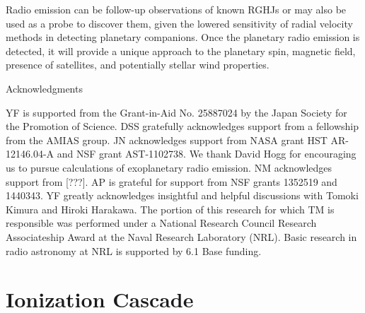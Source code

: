 \documentclass[iop,numberedappendix,apj]{emulateapj}
\begin{document}
Radio emission can be follow-up observations of known RGHJs or may also be used as a probe to discover them, given the lowered sensitivity of  radial velocity methods in detecting planetary companions. 
Once the planetary radio emission is detected, it will provide a unique approach to the planetary spin, magnetic field, presence of satellites, and potentially stellar wind properties. 


\vspace{0.5in}

\acknowledgements

{\sc Acknowledgments}

YF is supported from the Grant-in-Aid No. 25887024 by the Japan Society for the Promotion of Science.
DSS gratefully acknowledges support from a fellowship from the AMIAS group. JN acknowledges support from NASA grant HST AR-12146.04-A and NSF grant AST-1102738.
We thank David Hogg for encouraging us to pursue calculations of exoplanetary radio emission.
NM acknowledges support from [???]. 
AP is grateful for support from NSF grants 1352519 and 1440343.
YF greatly acknowledges insightful and helpful discussions with Tomoki Kimura and Hiroki Harakawa. 
The portion of this research for which TM is responsible was performed under a National Research 
Council Research Associateship Award at the Naval Research Laboratory (NRL).
Basic research in radio astronomy at NRL is supported by 6.1 Base funding.





\newpage

\appendix



\section{Ionization Cascade}
\label{sec:AppendixB}
\end{document}
